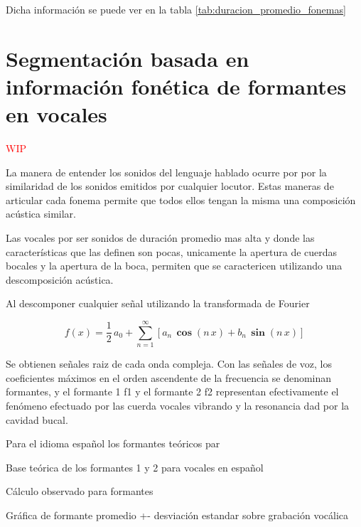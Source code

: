 Dicha información se puede ver en la tabla \ref{tab:duracion_promedio_fonemas}



\section{Segmentación basada en información fonética de formantes en vocales}

\textcolor{red}{WIP}

La manera de entender los sonidos del lenguaje hablado ocurre por por la similaridad de los sonidos emitidos por cualquier locutor. Estas maneras de articular cada fonema permite que todos ellos tengan la misma una composición acústica similar.

Las vocales por ser sonidos de duración promedio mas alta y donde las características que las definen son pocas, unicamente la apertura de cuerdas bocales y la apertura de la boca, permiten que se caractericen utilizando una descomposición acústica.

Al descomponer cualquier señal utilizando la transformada de Fourier

\begin{equation}
\label{eq:fourier}    
f(x) = \frac{1}{2} \, a_{0} + \sum_{n=1}^{\infty} \left[
   a_{n}\,\boldsymbol{\cos} (n\,x) + b_{n} \,\boldsymbol{\sin} (n\,x) \right]
\end{equation}

Se obtienen señales raiz de cada onda compleja. Con las señales de voz, los coeficientes máximos  en el orden ascendente de la frecuencia se denominan formantes, y el formante 1 f1 y el formante 2 f2 representan efectivamente el fenómeno efectuado por las cuerda vocales vibrando y la resonancia dad por la cavidad bucal.

Para el idioma español los formantes teóricos par






Base teórica de los formantes 1 y 2 para vocales en español

Cálculo observado para formantes 

Gráfica de formante promedio +- desviación estandar sobre grabación vocálica


% 
% 

